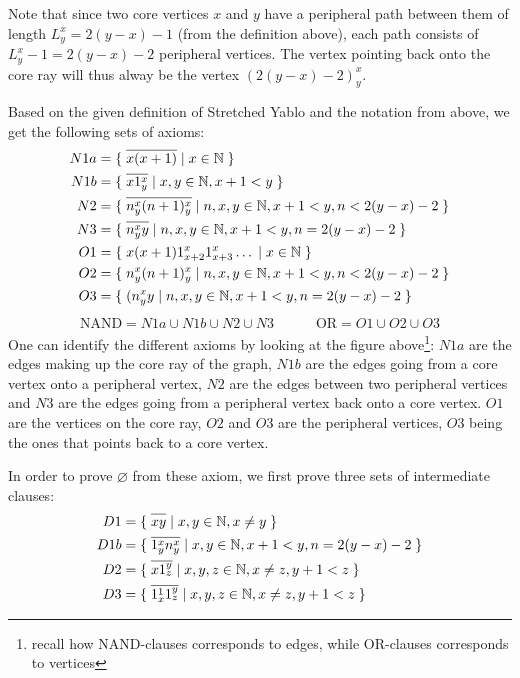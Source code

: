 Note that since two core vertices $x$ and $y$ have a peripheral path between them of length $L^x_y = 2(y-x) - 1$ (from the definition above), each path consists of $L^x_y - 1 = 2(y-x) - 2$ peripheral vertices.
The vertex pointing back onto the core ray will thus alway be the vertex $(2(y-x)-2)^x_y$.

Based on the given definition of Stretched Yablo and the notation from above, we get the following sets of axioms:
\begin{align}
  N1a &= \{\; \ol{x(x+1)} \;|\; x \in \mathbb{N} \; \} \\
	N1b &= \{\; \ol{x1^x_y} \;|\; x,y \in \mathbb{N}, x+1 < y \; \} \\
	N2 &= \{\; \ol{n^x_y(n+1)^x_y} \;|\; n,x,y \in \mathbb{N}, x+1 < y, n < 2(y-x) - 2 \; \} \\
	N3 &= \{\; \ol{n^x_yy} \;|\; n,x,y \in \mathbb{N}, x+1 < y, n = 2(y-x)-2 \; \} \\
	O1 &= \{\; x(x+1)1^x_{x+2}1^x_{x+3}\dots \;|\; x \in \mathbb{N} \; \} \\
  O2 &= \{\; n^x_y(n+1)^x_y \;|\; n,x,y \in \mathbb{N}, x+1 < y, n < 2(y-x) - 2 \; \} \\
	O3 &= \{\; (n^x_yy \;|\; n,x,y \in \mathbb{N}, x+1 < y, n = 2(y-x)-2 \; \}
\end{align}
\begin{align}
  \text{NAND} = N1a \cup N1b \cup N2 \cup N3 \quad\quad\quad \text{OR} = O1 \cup O2 \cup O3
\end{align}
One can identify the different axioms by looking at the figure above\footnote{recall how NAND-clauses corresponds to edges, while OR-clauses corresponds to vertices}:
$N1a$ are the edges making up the core ray of the graph, $N1b$ are the edges going from a core vertex onto a peripheral vertex, $N2$ are the edges between two peripheral vertices and $N3$ are the edges going from a peripheral vertex back onto a core vertex.
$O1$ are the vertices on the core ray, $O2$ and $O3$ are the peripheral vertices, $O3$ being the ones that points back to a core vertex.

In order to prove $\varnothing$ from these axiom, we first prove three sets of intermediate clauses:
\begin{align}
  D1 &= \{\; \ol{xy} \;|\; x,y \in \mathbb{N}, x \neq y \; \} \\
  D1b &= \{\; \ol{1^x_yn^x_y} \;|\; x,y \in \mathbb{N}, x+1 < y, n = 2(y-x)-2 \; \} \\
  D2 &= \{\; \ol{x1^y_z} \;|\; x,y,z \in \mathbb{N}, x \neq z, y+1 < z \; \} \\
  D3 &= \{\; \ol{1^1_x1^y_z} \;|\; x,y,z \in \mathbb{N}, x \neq z, y+1 < z \; \}
\end{align}
